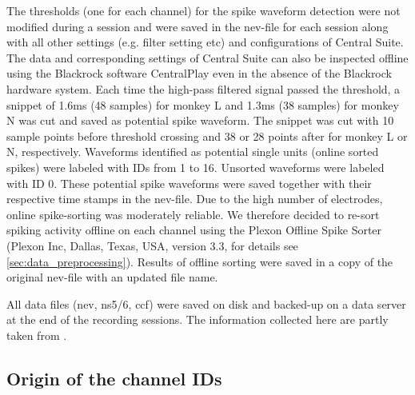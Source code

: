 The thresholds (one for each channel) for the spike waveform detection were not modified during a session and were saved in the nev-file for each session along with all other settings (e.g. filter setting etc) and configurations of Central Suite. The data and corresponding settings of Central Suite can also be inspected offline using the Blackrock software CentralPlay even in the absence of the Blackrock hardware system. Each time the high-pass filtered signal passed the threshold, a snippet of 1.6ms (48 samples) for monkey L and 1.3ms (38 samples) for monkey N was cut and saved as potential spike waveform. The snippet was cut with 10 sample points before threshold crossing and 38 or 28 points after for monkey L or N, respectively. Waveforms identified as potential single units (online sorted spikes) were labeled with IDs from 1 to 16. Unsorted waveforms were labeled with ID 0. These potential spike waveforms were saved together with their respective time stamps in the nev-file. Due to the high number of electrodes, online spike-sorting was moderately reliable. We therefore decided to re-sort spiking activity offline on each channel using the Plexon Offline Spike Sorter (Plexon Inc, Dallas, Texas, USA, version 3.3, for details see \cref{sec:data_preprocessing}). Results of offline sorting were saved in a copy of the original nev-file with an updated file name. 

All data files (nev, ns5/6, ccf) were saved on disk and backed-up on a data server at the end of the recording sessions. The information collected here are partly taken from \citep{Riehle_2013, Zehl_2016}.


\subsection{Origin of the channel IDs}
\label{sec:channel_ids}

